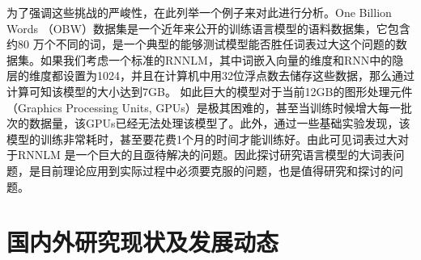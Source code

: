 \documentclass[12pt,a4paper]{article}
\begin{document}
为了强调这些挑战的严峻性，在此列举一个例子来对此进行分析。One Billion Words （OBW）数据集是一个近年来公开的训练语言模型的语料数据集，它包含约80 万个不同的词，是一个典型的能够测试模型能否胜任词表过大这个问题的数据集。如果我们考虑一个标准的RNNLM，其中词嵌入向量的维度和RNN中的隐层的维度都设置为1024，并且在计算机中用32位浮点数去储存这些数据，那么通过计算可知该模型的大小达到7GB。 如此巨大的模型对于当前12GB的图形处理元件（Graphics Processing Units, GPUs）是极其困难的，甚至当训练时候增大每一批次的数据量，该GPUs已经无法处理该模型了。此外，通过一些基础实验发现，该模型的训练非常耗时，甚至要花费1个月的时间才能训练好。由此可见词表过大对于RNNLM 是一个巨大的且亟待解决的问题。因此探讨研究语言模型的大词表问题，是目前理论应用到实际过程中必须要克服的问题，也是值得研究和探讨的问题。



\section{国内外研究现状及发展动态}
\end{document}
